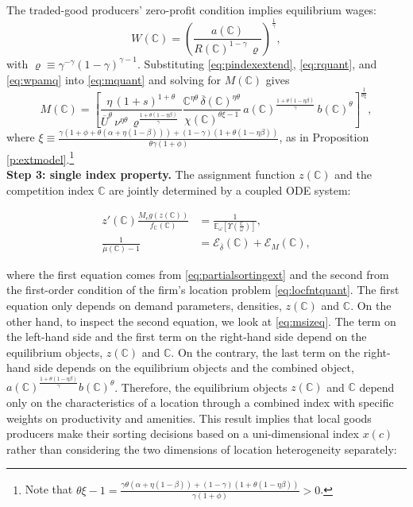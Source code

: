 The traded-good producers’ zero-profit condition implies equilibrium wages:
\begin{equation}\label{eq:wpamq}
	W(\mathbb{C}) = \left( \frac{a(\mathbb{C})}{R(\mathbb{C})^{1-\gamma}\, \varrho} \right)^{\frac{1}{\gamma}},
\end{equation}
with $\varrho \equiv \gamma^{-\gamma}(1-\gamma)^{\gamma-1}$. Substituting \eqref{eq:pindexextend}, \eqref{eq:rquant}, and \eqref{eq:wpamq} into \eqref{eq:mquant} and solving for $M(\mathbb{C})$ gives
\begin{equation}\label{eq:msizeq}
	M(\mathbb{C}) 
	= \left[
	\frac{\eta\, (1+s)^{1+\theta}}{\overline{U}^{\theta}\, \nu^{\eta \theta}\, \varrho^{\frac{1+\theta(1-\eta\beta)}{\gamma}}}
	\frac{\mathbb{C}^{\eta \theta}\, \overline{\delta}(\mathbb{C})^{\eta \theta}}{\chi(\mathbb{C})^{\theta\xi - 1}}
	\, a(\mathbb{C})^{\frac{1+\theta(1-\eta\beta)}{\gamma}}\, b(\mathbb{C})^{\theta}
	\right]^{\frac{1}{\theta\xi}},
\end{equation}
where $\xi \equiv \frac{\gamma\left(1 + \phi + \theta(\alpha + \eta(1-\beta))\right) + (1-\gamma)(1+\theta(1-\eta\beta))}{\theta\gamma(1+\phi)}$, as in Proposition \ref{p:extmodel}.\footnote{Note that $\theta\xi - 1 = \frac{\gamma\theta(\alpha + \eta(1-\beta)) + (1-\gamma)(1+\theta(1-\eta\beta))}{\gamma(1+\phi)} > 0$.}\\

\noindent \textbf{Step 3: single index property.}
The assignment function $z({\mathbb{C}})$ and the competition index ${\mathbb{C}}$ are jointly determined by a coupled ODE system:

\begin{align}
	z'({\mathbb{C}}) \frac{M_e g(z({\mathbb{C}}))}{f_{{\mathbb{C}}}({\mathbb{C}})} & = \frac{1}{\mathbb{E}_{\omega}\left[\Upsilon\left(\frac{{\mathbb{C}}}{\omega}\right) \right]}, \nonumber \\ 
    \frac{1}{\overline{\mu}(\mathbb{C}) - 1} & = \mathcal{E}_{\overline{\delta}}({\mathbb{C}}) +  \mathcal{E}_{M}({\mathbb{C}}), \label{eq:focq}
\end{align}

where the first equation comes from \eqref{eq:partialsortingext} and the second from the first-order condition of the firm's location problem \eqref{eq:locfntquant}. The first equation only depends on demand parameters, densities, $z({\mathbb{C}})$ and ${\mathbb{C}}$. On the other hand, to inspect the second equation, we look at \eqref{eq:msizeq}. The term on the left-hand side and the first term on the right-hand side depend on the equilibrium objects, $z({\mathbb{C}})$ and ${\mathbb{C}}$. On the contrary, the last term on the right-hand side depends on the equilibrium objects and the combined object, $a({\mathbb{C}})^{\frac{1+\theta(1-\eta \beta)}{\gamma}} b({\mathbb{C}})^\theta$. Therefore, the equilibrium objects $z({\mathbb{C}})$ and ${\mathbb{C}}$ depend only on the characteristics of a location through a combined index with specific weights on productivity and amenities. This result implies that local goods producers make their sorting decisions based on a uni-dimensional index $x(c)$ rather than considering the two dimensions of location heterogeneity separately:

